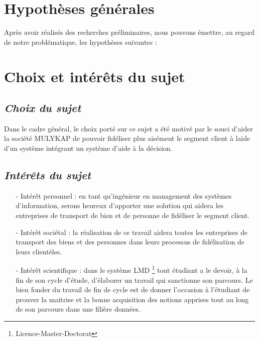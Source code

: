 \documentclass[a4paper,12pt,oneside]{book}
\begin{document}
    \section[Hypothèses générales]{Hypothèses générales}
    Après avoir réalisés des recherches préliminaires, nous pouvons émettre, au regard
    de notre problématique, les hypothèses suivantes :

    \section[Choix et interet du sujet]{Choix et intérêts du sujet}
        \subsection[Choix du sujet]{\textit{Choix du sujet}}
        Dans le cadre général, le choix porté sur ce sujet a été motivé par le souci d’aider
        la société MULYKAP de pouvoir fidéliser plus aisément le segment client à laide d’un
        système intégrant un système d’aide à la décision.
        \subsection[Interet du sujet]{\textit{Intérêts du sujet}}
            \begin{itemize}
                \item [-] Intérêt personnel : en tant qu’ingénieur en management 
                des systèmes d’information, serons heureux d’apporter une solution
                qui aidera les entreprises de transport de bien et de personne de fidéliser
                le segment client.
                \newline

                \item [-] Intérêt sociétal : la réalisation de ce travail aidera toutes les
                entreprises de transport des biens et des personnes dans leurs processus de
                fidélisation de leurs clientèles.
                \newline

                \item [-] Intérêt scientifique : dans le système LMD \footnote[1]{Licence-Master-Doctorat} tout étudiant
                a le devoir, à la fin de son cycle d’étude, d’élaborer un travail qui
                sanctionne son parcours. Le bien fonder du travail de fin de cycle
                est de donner l’occasion à l’étudiant de prouver la maitrise et la bonne acquisition
                des notions apprises tout au long de son parcours dans une filière données.
            \end{itemize}
\end{document}
